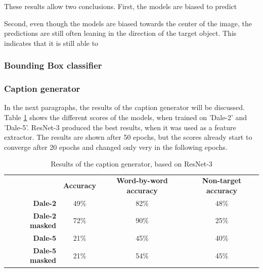 These results allow two conclusions.
First, the models are biased to predict

Second, even though the models are biased towards the center of the image, the predictions are still often leaning in the direction of the target object.
This indicates that it is still able to

\subsubsection{Bounding Box classifier}

\subsubsection{Caption generator}
In the next paragraphs, the results of the caption generator will be discussed.
Table \ref{tab:results_caption-generator} shows the different scores of the models, when trained on 'Dale-2' and 'Dale-5'.
ResNet-3 produced the best results, when it was used as a feature extractor.
The results are shown after 50 epochs, but the scores already start to converge after 20 epochs and changed only very in the following epochs.

\begin{table}[h]
    \centering
    \begin{tabular}{rccc}
        \toprule
                               & \textbf{Accuracy} & \textbf{Word-by-word accuracy} & \textbf{Non-target accuracy} \\
        \textbf{Dale-2}        & 49\%              & 82\%                           & 48\%                         \\
        \textbf{Dale-2 masked} & 72\%              & 90\%                           & 25\%                         \\
        \textbf{Dale-5}        & 21\%              & 45\%                           & 40\%                         \\
        \textbf{Dale-5 masked} & 21\%              & 54\%                           & 45\%                         \\
        \bottomrule
    \end{tabular}
    \caption{Results of the caption generator, based on ResNet-3}
    \label{tab:results_caption-generator}
\end{table}

